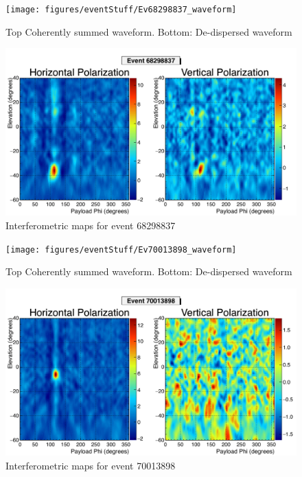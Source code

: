 		\begin{figure}
		\centering
			\texttt{[image: figures/eventStuff/Ev68298837\_waveform]}
			\caption{Top Coherently summed waveform.  Bottom: De-dispersed waveform} 
		\label{fig:Ev68298837_waveform}
		\end{figure}
		
		\begin{figure}
		\centering
			\includegraphics[width=\textwidth]{figures/intMap/intMap_ev68298837}
			\caption{Interferometric maps for event 68298837} 
		\label{fig:Ev68298837_map}
		\end{figure}			
	
		\begin{figure}
		\centering
			\texttt{[image: figures/eventStuff/Ev70013898\_waveform]}
			\caption{Top Coherently summed waveform.  Bottom: De-dispersed waveform} 
		\label{fig:Ev70013898_waveform}
		\end{figure}
		
		\begin{figure}
		\centering
			\includegraphics[width=\textwidth]{figures/intMap/intMap_ev70013898}
			\caption{Interferometric maps for event 70013898} 
		\label{fig:Ev70013898_map}
		\end{figure}			
	
